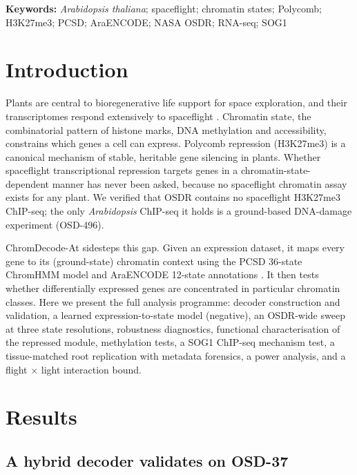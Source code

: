 \documentclass[11pt,a4paper]{article}
\newcommand{\ChromDecode}{ChromDecode-At}
\begin{document}
\noindent\textbf{Keywords:} \textit{Arabidopsis thaliana}; spaceflight; chromatin
states; Polycomb; H3K27me3; PCSD; AraENCODE; NASA OSDR; RNA-seq; SOG1

\section{Introduction}

Plants are central to bioregenerative life support for space exploration, and their
transcriptomes respond extensively to spaceflight
\citep{gebre2025osdr,berrios2021genelab,paul2017genetic}. Chromatin state, the combinatorial pattern of histone marks,
DNA methylation and accessibility, constrains which genes a cell can express. Polycomb
repression (H3K27me3) is a canonical mechanism of stable, heritable gene silencing in
plants. Whether spaceflight transcriptional repression targets genes in a
chromatin-state-dependent manner has never been asked, because no spaceflight
chromatin assay exists for any plant. We verified that OSDR contains no spaceflight
H3K27me3 ChIP-seq; the only \textit{Arabidopsis} ChIP-seq it holds is a ground-based
DNA-damage experiment (OSD-496).

\ChromDecode{} sidesteps this gap. Given an expression dataset, it maps every gene to
its (ground-state) chromatin context using the PCSD 36-state ChromHMM model
\citep{liu2018pcsd,ernst2012chromhmm} and AraENCODE 12-state annotations
\citep{wang2023araencode}. It then tests whether differentially expressed genes are concentrated
in particular chromatin classes. Here we present the full analysis programme:
decoder construction and validation, a learned expression-to-state model (negative),
an OSDR-wide sweep at three state resolutions, robustness diagnostics, functional
characterisation of the repressed module, methylation tests, a SOG1 ChIP-seq mechanism
test, a tissue-matched root replication with metadata forensics, a power analysis, and
a flight $\times$ light interaction bound.

\section{Results}

\subsection{A hybrid decoder validates on OSD-37}
\end{document}
